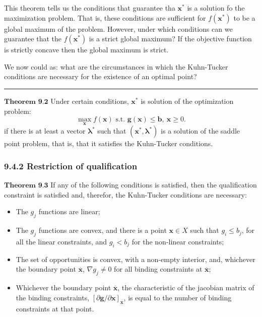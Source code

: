 \documentclass[0pt, a4paper]{article}
\begin{document}
This theorem tells us the conditions that guarantee tha $\textbf{x}^*$ is a solution fo the maximization problem. That is, these conditions are sufficient for $f(\textbf{x}^*)$ to be a global maximum of the problem. However, under which conditions can we guarantee that the $f(\textbf{x}^*)$ is a strict global maximum? If the objective function is strictly concave then the global maximum is strict.

We now could as: what are the circumstances in which the Kuhn-Tucker conditions are necessary for the existence of an optimal point?

\noindent\rule{\textwidth}{1pt}

$\textbf{Theorem 9.2}$ Under certain conditions, $\textbf{x}^*$ is solution of the optimization problem:
$$\max_\textbf{x}f(\textbf{x})\text{ s.t. }\textbf{g}(\textbf{x})\leq\textbf{b},\ \textbf{x}\geq0.$$
if there is at least a vector $\boldsymbol{\lambda}^*$ such that $(\textbf{x}^*,\boldsymbol{\lambda}^*)$ is a solution of the saddle point problem, that is, that it satisfies the Kuhn-Tucker conditions.


\subsubsection*{9.4.2 Restriction of qualification}

$\textbf{Theorem 9.3}$ If any of the following conditions is satisfied, then the qualification constraint is satisfied and, therefor, the Kuhn-Tucker conditions are necessary:
\begin{itemize}
	\item The $g_j$ functions are linear;
	\item The $g_j$ functions are convex, and there is a point $\textbf{x}\in X$ such that $g_i\leq b_j$, for all the linear constraints, and $g_i< b_j$ for the non-linear constraints;
	\item The set of opportunities is convex, with a non-empty interior, and, whichever the boundary point $\overline{\textbf{x}}$, $\nabla g_j\neq0$ for all binding constraints at $\overline{\textbf{x}}$;
	\item Whichever the boundary point $\overline{\textbf{x}}$, the characteristic of the jacobian matrix of the binding constraints, $\left[\partial\textbf{g}/\partial\textbf{x}\right]_{\overline{\textbf{x}}}$, is equal to the number of binding constraints at that point.
\end{itemize}
\end{document}

